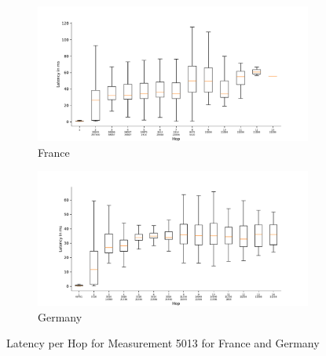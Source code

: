 \begin{figure}
	\centering
	\begin{subfigure}[b]{\linewidth}
		\includegraphics[width=\linewidth]{chapters/4-results/traceroute/img/latency-per-hop-FR-5013.pdf}
		\caption{France}
	\end{subfigure}
	\begin{subfigure}[b]{\linewidth}
		\includegraphics[width=\linewidth]{chapters/4-results/traceroute/img/latency-per-hop-DE-5013.pdf}
		\caption{Germany}
	\end{subfigure}
	\caption{Latency per Hop for Measurement 5013 for France and Germany}
	\label{fig:latency-change-per-hop-appendix-14}
\end{figure}

